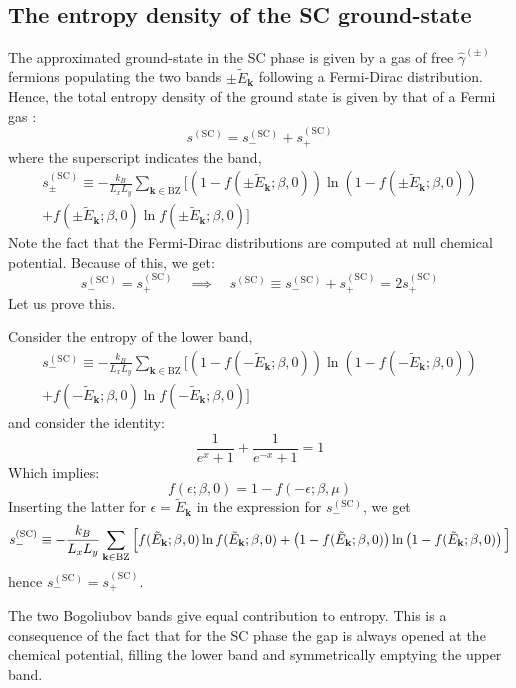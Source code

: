 \subsection{The entropy density of the SC ground-state}\label{subsec:sc-s}

The approximated ground-state in the SC phase is given by a gas of free $\hat \gamma^{(\pm)}$ fermions populating the two bands $\pm \tilde{E}_\mathbf{k}$ following a Fermi-Dirac distribution. Hence, the total entropy density of the ground state is given by that of a Fermi gas \cite{grosso2014solid}:
\[
	s^{(\mathrm{SC})} = s_-^{(\mathrm{SC})} + s_+^{(\mathrm{SC})}
\]
where the superscript indicates the band,
\begin{multline}
	s_\pm^{(\mathrm{SC})} \equiv -\frac{k_B}{L_x L_y} \sum_{\mathbf{k}\in\mathrm{BZ}} \Big[
	\left(
	1- f( \pm\tilde{E}_\mathbf{k}; \beta,0)
	\right) \ln \left(
	1- f( \pm\tilde{E}_\mathbf{k}; \beta,0)
	\right) \\
	+ f(
	\pm\tilde{E}_\mathbf{k}; \beta,0)
	\ln f( \pm\tilde{E}_\mathbf{k}; \beta,0)
	\Big] \label{eq:sc-s}
\end{multline}
Note the fact that the Fermi-Dirac distributions are computed at null chemical potential. Because of this, we get:
\[
	s^{(\mathrm{SC})}_- = s_+^{(\mathrm{SC})}
	\quad\implies\quad
	s^{(\mathrm{SC})} \equiv s_-^{(\mathrm{SC})} + s_+^{(\mathrm{SC})} = 2 s_+^{(\mathrm{SC})}
\]
Let us prove this.

\begin{tabproof}
	
	Consider the entropy of the lower band,
	\begin{multline*}
		s_-^{(\mathrm{SC})} \equiv -\frac{k_B}{L_x L_y} \sum_{\mathbf{k}\in\mathrm{BZ}} \Big[
			\left(
			1- f( -\tilde{E}_\mathbf{k}; \beta,0)
			\right) \ln \left(
			1- f( -\tilde{E}_\mathbf{k}; \beta,0)
			\right) \\
			+ f(
			-\tilde{E}_\mathbf{k}; \beta,0)
			\ln f( -\tilde{E}_\mathbf{k}; \beta,0)
		\Big]
	\end{multline*}
	and consider the identity:
	\[
		\frac{1}{e^x +1} + \frac{1}{e^{-x} +1} = 1
	\]
	Which implies:
	\[
		f(\epsilon;\beta,0) = 1-f(-\epsilon;\beta,\mu)
	\]
	Inserting the latter for $\epsilon=\tilde{E}_\mathbf{k}$ in the expression for $s_-^{(\mathrm{SC})}$, we get
	\[
		s_-^{(\mathrm{SC})} \equiv -\frac{k_B}{L_x L_y} \sum_{\mathbf{k}\in\mathrm{BZ}} \Big[
			f(
			\tilde{E}_\mathbf{k}; \beta,0)
			\ln f( \tilde{E}_\mathbf{k}; \beta,0) \\
			+ \left(
			1- f( \tilde{E}_\mathbf{k}; \beta,0)
			\right) \ln \left(
			1- f( \tilde{E}_\mathbf{k}; \beta,0)
			\right)
		\Big]
	\]
	hence $s_-^{(\mathrm{SC})}=s_+^{(\mathrm{SC})}$.	
\end{tabproof}
%
The two Bogoliubov bands give equal contribution to entropy. This is a consequence of the fact that for the SC phase the gap is always opened at the chemical potential, filling the lower band and symmetrically emptying the upper band.

